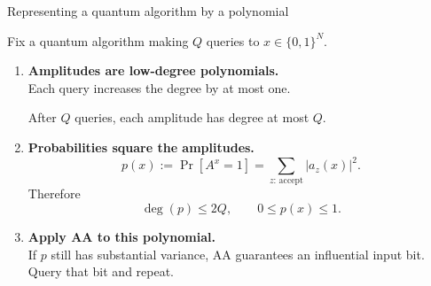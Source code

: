 \documentclass[aspectratio=169,11pt]{beamer}
\begin{document}
\begin{frame}{Representing a quantum algorithm by a polynomial}

Fix a quantum algorithm making $Q$ queries to
$x\in\{0,1\}^N$.

\begin{enumerate}[<+->]
  \item \textbf{Amplitudes are low-degree polynomials.}\\
  Each query increases the degree by at most one.

  After $Q$ queries, each amplitude has degree at most $Q$.

  \medskip
  \item \textbf{Probabilities square the amplitudes.}
  \[
    p(x):=\Pr[A^x=1]
      =\sum_{z:\,\mathrm{accept}} |a_z(x)|^2.
  \]
  Therefore
  \[
    \boxed{\deg(p)\le 2Q,\qquad 0\le p(x)\le1.}
  \]

  \item \textbf{Apply AA to this polynomial.}\\
  If $p$ still has substantial variance, AA guarantees
  an influential input bit.
  Query that bit and repeat.
\end{enumerate}

\medskip
{}

\end{frame}
\end{document}
